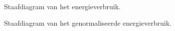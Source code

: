 	
	\begin{figure}
		\caption{Staafdiagram van het energieverbruik.}
		\label{fig:Figure_5}
	\end{figure}

	\begin{figure}
		\caption{Staafdiagram van het genormaliseerde energieverbruik.}
		\label{fig:Figure_6}
	\end{figure}



